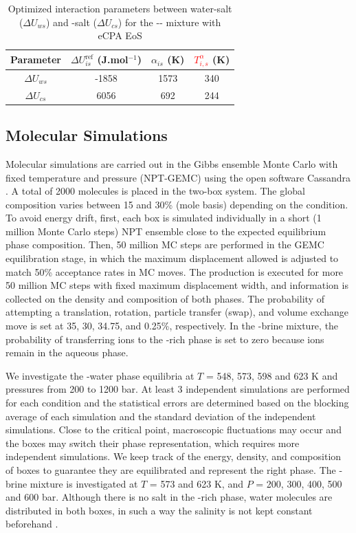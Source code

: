 \begin{table}[]
\caption{Optimized interaction parameters between water-salt ($\Delta U_{ws}$)\cite{Maribo2015} and -salt ($\Delta U_{cs}$) for the -- mixture with eCPA EoS}
\centering
\begin{tabular}{cccc}
\hline
\hline
 \textbf{Parameter} & $\Delta U^\text{ref}_{is}$ (J.mol$^{-1}$) & $\alpha_{is}$ (K) & \textcolor{red}{$T^\alpha_{i,s}$} (K)\\ 
 \hline
$\Delta U_{ws}$ & -1858 & 1573 & 340 \\
$\Delta U_{cs}$ & 6056 & 692 & 244 \\
 \hline
 \hline
\end{tabular}
\label{Ucs_Uws}
\end{table}



\newpage

\subsection{Molecular Simulations}
Molecular simulations are carried out in the Gibbs ensemble Monte Carlo with fixed temperature and pressure (NPT-GEMC) using the open software Cassandra \cite{cassandra}. A total of 2000 molecules is placed in the two-box system. The  global composition varies between 15 and 30\% (mole basis) depending on the condition. To avoid energy drift, first, each box is simulated individually in a short (1 million Monte Carlo steps) NPT ensemble close to the expected equilibrium phase composition. Then, 50 million MC steps are performed in the GEMC equilibration stage, in which the maximum displacement allowed is adjusted to match 50\% acceptance rates in MC moves. The production is executed for more 50 million MC steps with fixed maximum displacement width, and information is collected on the density and composition of both phases. The probability of attempting a translation, rotation, particle transfer (swap), and volume exchange move is set at 35, 30, 34.75, and 0.25\%, respectively. In the -brine mixture, the probability of transferring ions to the -rich phase is set to zero because ions remain in the aqueous phase. 

We investigate the -water phase equilibria at $T$ = 548, 573, 598 and 623 K and pressures from 200 to 1200 bar. At least 3 independent simulations are performed for each condition and the statistical errors are determined based on the blocking average of each simulation and the standard deviation of the independent simulations. Close to the critical point, macroscopic fluctuations may occur and the boxes may switch their phase representation, which requires more independent simulations. We keep track of the energy, density, and composition of boxes to guarantee they are equilibrated and represent the right phase. The -brine mixture is investigated at  $T$ = 573 and 623 K, and $P$ = 200, 300, 400, 500 and 600 bar. Although there is no salt in the -rich phase, water molecules are distributed in both boxes, in such a way the salinity is not kept constant beforehand \cite{Vorholz2004}.  

